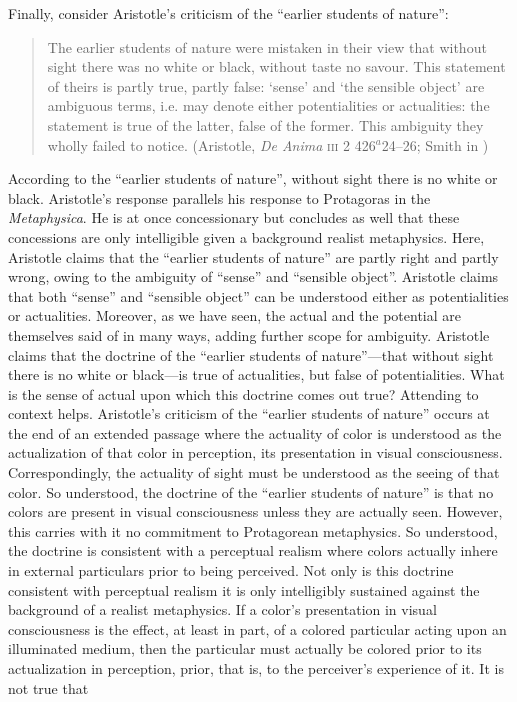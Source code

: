 Finally, consider Aristotle's criticism of the ``earlier students of nature'':
\begin{quote}
	The earlier students of nature were mistaken in their view that without sight there was no white or black, without taste no savour. This statement of theirs is partly true, partly false: ‘sense’ and ‘the sensible object’ are ambiguous terms, i.e. may denote either potentialities or actualities: the statement is true of the latter, false of the former. This ambiguity they wholly failed to notice. (Aristotle, \emph{De Anima} \textsc{iii} 2 426\( ^{a} \)24--26; Smith in \citealt[46--47]{Barnes:1984uq})
\end{quote}
According to the ``earlier students of nature'', without sight there is no white or black. Aristotle's response parallels his response to Protagoras in the \emph{Metaphysica}. He is at once concessionary but concludes as well that these concessions are only intelligible given a background realist metaphysics. Here, Aristotle claims that the ``earlier students of nature'' are partly right and partly wrong, owing to the ambiguity of ``sense'' and ``sensible object''. Aristotle claims that both ``sense'' and ``sensible object'' can be understood either as potentialities or actualities. Moreover, as we have seen, the actual and the potential are themselves said of in many ways, adding further scope for ambiguity. Aristotle claims that the doctrine of the ``earlier students of nature''---that without sight there is no white or black---is true of actualities, but false of potentialities. What is the sense of actual upon which this doctrine comes out true? Attending to context helps. Aristotle's criticism of the ``earlier students of nature'' occurs at the end of an extended passage where the actuality of color is understood as the actualization of that color in perception, its presentation in visual consciousness. Correspondingly, the actuality of sight must be understood as the seeing of that color. So understood, the doctrine of the ``earlier students of nature'' is that no colors are present in visual consciousness unless they are actually seen. However, this carries with it no commitment to Protagorean metaphysics. So understood, the doctrine is consistent with a perceptual realism where colors actually inhere in external particulars prior to being perceived. Not only is this doctrine consistent with perceptual realism it is only intelligibly sustained against the background of a realist metaphysics. If a color's presentation in visual consciousness is the effect, at least in part, of a colored particular acting upon an illuminated medium, then the particular must actually be colored prior to its actualization in perception, prior, that is, to the perceiver's experience of it. It is not true that 